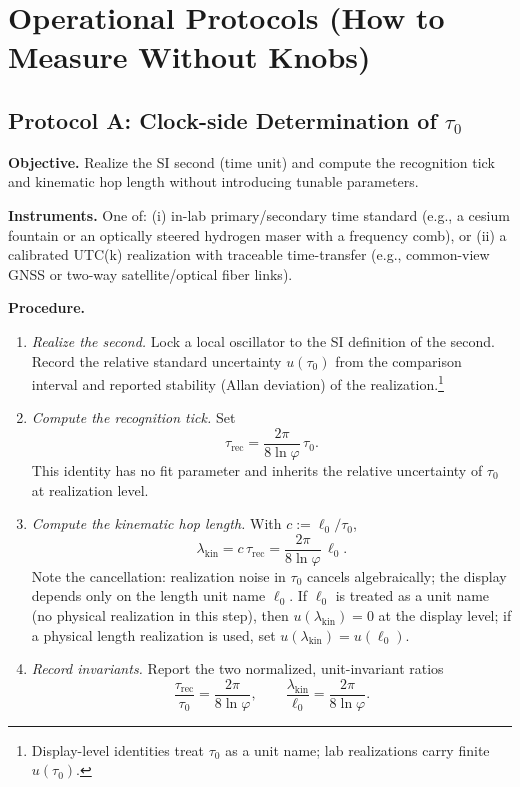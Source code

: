 \documentclass[11pt]{article}
\theoremstyle{plain}
\theoremstyle{definition}
\theoremstyle{remark}
\begin{document}
\section{Operational Protocols (How to Measure Without Knobs)}

\subsection*{Protocol A: Clock-side Determination of \(\tau_{0}\)}
\textbf{Objective.} Realize the SI second (time unit) and compute the recognition tick and kinematic hop length without introducing tunable parameters.

\textbf{Instruments.} One of:
(i) in-lab primary/secondary time standard (e.g., a cesium fountain or an optically steered hydrogen maser with a frequency comb), or
(ii) a calibrated UTC(k) realization with traceable time-transfer (e.g., common-view GNSS or two-way satellite/optical fiber links).

\textbf{Procedure.}
\begin{enumerate}
  \item \emph{Realize the second.} Lock a local oscillator to the SI definition of the second. Record the relative standard uncertainty \(u(\tau_{0})\) from the comparison interval and reported stability (Allan deviation\cite{Allan1966,NISTSP1065}) of the realization.\footnote{Display-level identities treat \(\tau_{0}\) as a unit name; lab realizations carry finite \(u(\tau_{0})\).}
  \item \emph{Compute the recognition tick.} Set
  \[
  \tau_{\mathrm{rec}}=\frac{2\pi}{8\ln\varphi}\,\tau_{0}.
  \]
  This identity has no fit parameter and inherits the relative uncertainty of \(\tau_{0}\) at realization level.
  \item \emph{Compute the kinematic hop length.} With \(c:=\ell_{0}/\tau_{0}\),
  \[
  \lambda_{\mathrm{kin}}=c\,\tau_{\mathrm{rec}}=\frac{2\pi}{8\ln\varphi}\,\ell_{0}.
  \]
  Note the cancellation: realization noise in \(\tau_{0}\) cancels algebraically; the display depends only on the length unit name \(\ell_{0}\). If \(\ell_{0}\) is treated as a unit name (no physical realization in this step), then \(u(\lambda_{\mathrm{kin}})=0\) at the display level; if a physical length realization is used, set \(u(\lambda_{\mathrm{kin}})=u(\ell_{0})\).
  \item \emph{Record invariants.} Report the two normalized, unit-invariant ratios
  \[
  \frac{\tau_{\mathrm{rec}}}{\tau_{0}}=\frac{2\pi}{8\ln\varphi},\qquad
  \frac{\lambda_{\mathrm{kin}}}{\ell_{0}}=\frac{2\pi}{8\ln\varphi}.
  \]
\end{enumerate}
\end{document}
